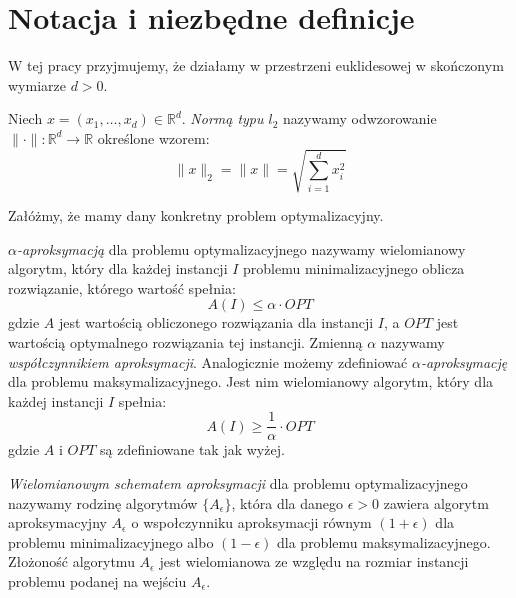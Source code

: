 \chapter{Notacja i niezbędne definicje}\label{preliminaries}

W tej pracy przyjmujemy, że działamy w przestrzeni euklidesowej w skończonym wymiarze $d > 0$.

\begin{definition}
    Niech $x = (x_{1}, \dots, x_{d}) \in \mathbb{R}^{d}$.
    \emph{Normą typu $l_{2}$} nazywamy odwzorowanie $\| \cdot \|: \mathbb{R}^{d} \rightarrow \mathbb{R}$ określone wzorem:
    \begin{equation}
        \|x\|_{2} = \|x\| = \sqrt{ \sum_{i = 1}^{d} x_{i}^{2} }
    \end{equation}
\end{definition}

\noindent
Załóżmy, że mamy dany konkretny problem optymalizacyjny. 

\begin{definition}
    \emph{$\alpha$-aproksymacją} dla problemu optymalizacyjnego nazywamy wielomianowy algorytm, który dla każdej instancji $I$ problemu minimalizacyjnego oblicza rozwiązanie, którego wartość spełnia: 
    \begin{equation}
        A(I) \leq \alpha \cdot OPT
    \end{equation}
    gdzie $A$ jest wartością obliczonego rozwiązania dla instancji $I$, a $OPT$ jest wartością optymalnego rozwiązania tej instancji.
    Zmienną $\alpha$ nazywamy \textit{współczynnikiem aproksymacji}.
    Analogicznie możemy zdefiniować  \emph{$\alpha$-aproksymację} dla problemu maksymalizacyjnego.
    Jest nim wielomianowy algorytm, który dla każdej instancji $I$ spełnia:
    \begin{equation}
        A(I) \geq \frac{1}{\alpha} \cdot OPT
    \end{equation}
    gdzie $A$ i $OPT$ są zdefiniowane tak jak wyżej.
\end{definition}

\begin{definition}
    \emph{Wielomianowym schematem aproksymacji} dla problemu optymalizacyjnego nazywamy rodzinę algorytmów $\{A_{\epsilon}\}$, która dla danego $\epsilon > 0$ zawiera algorytm aproksymacyjny $A_{\epsilon}$ o wspołczynniku aproksymacji równym $(1+\epsilon)$ dla problemu minimalizacyjnego albo $(1-\epsilon)$ dla problemu maksymalizacyjnego.
    Złożoność algorytmu $A_{\epsilon}$ jest wielomianowa ze względu na rozmiar instancji problemu podanej na wejściu $A_{\epsilon}$.
\end{definition}

